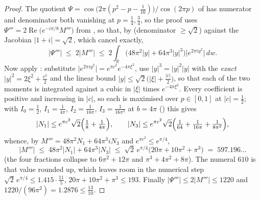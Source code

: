 \begin{proof}
\leanok
The quotient $\Psi=\cos\bigl(2\pi(p^{2}-p-\tfrac1{16})\bigr)/\cos(2\pi p)$ of
 has numerator and denominator both vanishing at
$p=\tfrac14,\tfrac34$, so the proof uses
$\Psi'''=2\operatorname{Re}\bigl(e^{-i\pi/8}M'''\bigr)$ from
, so that, by  (denominator $\ge\sqrt2$)
against the Jacobian $\lvert1+i\rvert=\sqrt2$, which cancel exactly,
\[
  \lvert\Psi'''\rvert\;\le\;2\lvert M'''\rvert
  \;\le\;2\int_{\mathbb{R}}\bigl(48\pi^{2}\lvert y\rvert+64\pi^{3}\lvert y\rvert^{3}\bigr)
     \bigl\lvert e^{2\pi iy^{2}}\bigr\rvert\,dw .
\]
Now apply : substitute $\lvert e^{2\pi iy^{2}}\rvert=e^{\pi
c^{2}}e^{-4\pi\xi^{2}}$, use $\lvert y\rvert^{3}=\lvert y\rvert^{2}\lvert y\rvert$ with the
\emph{exact} $\lvert y\rvert^{2}=2\xi^{2}+\tfrac{c^{2}}2$ and the linear bound $\lvert
y\rvert\le\sqrt2\bigl(\lvert\xi\rvert+\tfrac{\lvert c\rvert}2\bigr)$, so that each of the two
moments is integrated against a cubic in $\lvert\xi\rvert$ times $e^{-4\pi\xi^{2}}$.  Every
coefficient is positive and increasing in $\lvert c\rvert$, so each is maximised over $p\in[0,1]$
at $\lvert c\rvert=\tfrac12$; with $I_{0}=\tfrac12$, $I_{1}=\tfrac1{4\pi}$,
$I_{2}=\tfrac1{16\pi}$, $I_{3}=\tfrac1{16\pi^{2}}$ at $b=4\pi$
() this gives
\[
  \lvert N_{1}\rvert\le e^{\pi c^{2}}\sqrt2\Bigl(\tfrac18+\tfrac1{4\pi}\Bigr),
  \qquad
  \lvert N_{3}\rvert\le e^{\pi c^{2}}\sqrt2\Bigl(\tfrac1{64}+\tfrac1{16\pi}
    +\tfrac1{8\pi^{2}}\Bigr),
\]
whence, by $M'''=48\pi^{2}N_{1}+64\pi^{3}iN_{3}$ and $e^{\pi c^{2}}\le e^{\pi/4}$,
\[
  \lvert M'''\rvert\;\le\;48\pi^{2}\lvert N_{1}\rvert+64\pi^{3}\lvert N_{3}\rvert
  \;\le\;\sqrt2\,e^{\pi/4}\bigl(20\pi+10\pi^{2}+\pi^{3}\bigr)\;=\;597.196\ldots
\]
(the four fractions collapse to $6\pi^{2}+12\pi$ and $\pi^{3}+4\pi^{2}+8\pi$).  The numeral
$610$ is that value rounded up, which leaves room in the numerical step
$\sqrt2\,e^{\pi/4}\le1.415\cdot\tfrac{11}5$, $20\pi+10\pi^{2}+\pi^{3}\le193$.  Finally $\lvert\Psi'''\rvert\le2\lvert M'''\rvert\le1220$ and
$1220/(96\pi^{2})=1.2876\le\tfrac{13}{10}$.
\end{proof}

